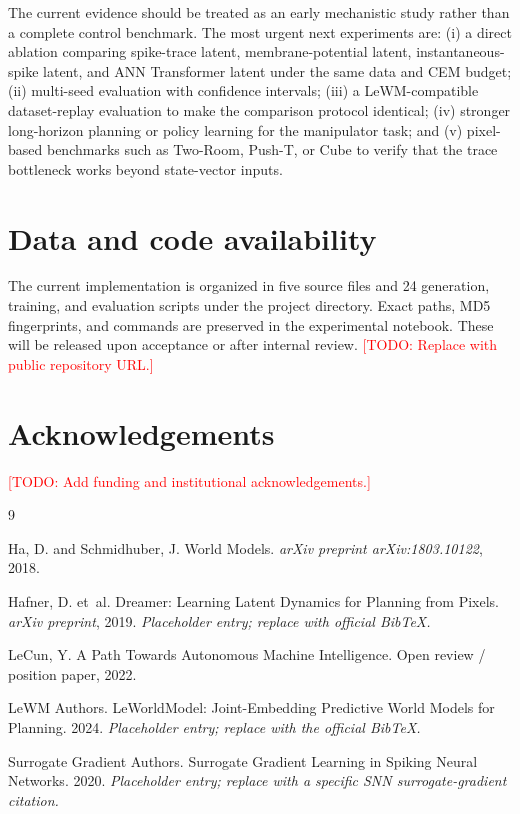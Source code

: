 \documentclass[10pt]{article}
\newcommand{\todo}[1]{\textcolor{red}{[TODO: #1]}}
\begin{document}
The current evidence should be treated as an early mechanistic study rather than a complete control benchmark. The most urgent next experiments are: (i) a direct ablation comparing spike-trace latent, membrane-potential latent, instantaneous-spike latent, and ANN Transformer latent under the same data and CEM budget; (ii) multi-seed evaluation with confidence intervals; (iii) a LeWM-compatible dataset-replay evaluation to make the comparison protocol identical; (iv) stronger long-horizon planning or policy learning for the manipulator task; and (v) pixel-based benchmarks such as Two-Room, Push-T, or Cube to verify that the trace bottleneck works beyond state-vector inputs.

\section*{Data and code availability}
The current implementation is organized in five source files and 24 generation, training, and evaluation scripts under the project directory. Exact paths, MD5 fingerprints, and commands are preserved in the experimental notebook. These will be released upon acceptance or after internal review. \todo{Replace with public repository URL.}

\section*{Acknowledgements}
\todo{Add funding and institutional acknowledgements.}

\begin{thebibliography}{9}

Ha, D. and Schmidhuber, J. World Models. \emph{arXiv preprint arXiv:1803.10122}, 2018.

Hafner, D. et~al. Dreamer: Learning Latent Dynamics for Planning from Pixels. \emph{arXiv preprint}, 2019. \textit{Placeholder entry; replace with official BibTeX.}

LeCun, Y. A Path Towards Autonomous Machine Intelligence. Open review / position paper, 2022.

LeWM Authors. LeWorldModel: Joint-Embedding Predictive World Models for Planning. 2024. \textit{Placeholder entry; replace with the official BibTeX.}

Surrogate Gradient Authors. Surrogate Gradient Learning in Spiking Neural Networks. 2020. \textit{Placeholder entry; replace with a specific SNN surrogate-gradient citation.}

\end{thebibliography}
\end{document}
